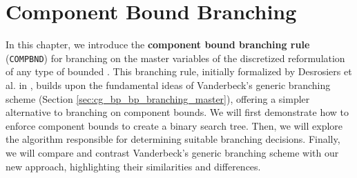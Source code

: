 \chapter{Component Bound Branching}\label{ch:cmpbnd}
In this chapter, we introduce the \textbf{component bound branching rule} (\texttt{COMPBND}) for branching on the master variables of the discretized reformulation of any type of bounded \IP{}. This branching rule, initially formalized by Desrosiers et al. in \cite{thebook}, builds upon the fundamental ideas of Vanderbeck's generic branching scheme (Section \ref{sec:cg_bp_bp_branching_master}), offering a simpler alternative to branching on component bounds. We will first demonstrate how to enforce component bounds to create a binary search tree. Then, we will explore the algorithm responsible for determining suitable branching decisions. Finally, we will compare and contrast Vanderbeck's generic branching scheme with our new approach, highlighting their similarities and differences.



